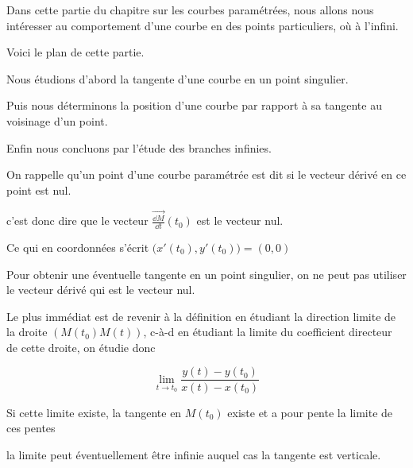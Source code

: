 






\debuttexte


\diapo

Dans cette partie du chapitre sur les courbes paramétrées, 
nous allons nous intéresser au comportement d'une courbe 
en des points particuliers, où à l'infini.

\change

Voici le plan de cette partie.

\change

Nous étudions d'abord la tangente d'une courbe en un point singulier.

\change

Puis nous déterminons la position d'une courbe par rapport à 
sa tangente au voisinage d'un point.

\change

Enfin nous concluons par l'étude des branches infinies.


\diapo



On rappelle qu'un point d'une courbe paramétrée est dit 
 si le vecteur dérivé en ce point est nul.

\change
c'est donc dire que le vecteur $\overrightarrow{\frac{\dd M}{\dd t}}(t_0)$ est le vecteur nul.

\change
Ce qui en coordonnées s'écrit $\big( x'(t_0), y'(t_0)\big) = (0,0)$

\change
Pour obtenir une éventuelle tangente en un point singulier, 
on ne peut pas utiliser le vecteur dérivé qui est le vecteur nul.

Le plus immédiat est de revenir à la définition en étudiant 
la direction limite de la droite $(M(t_0)M(t))$, c-à-d
en étudiant la limite du coefficient directeur de cette droite, on étudie donc 

$$\displaystyle \lim_{t\rightarrow t_0}\frac{y(t)-y(t_0)}{x(t)-x(t_0)}$$

\change
Si cette limite existe, la tangente en $M(t_0)$ existe et a pour pente 
la limite de ces pentes 

\change
\change
la limite peut éventuellement être infinie auquel cas la tangente est verticale.


